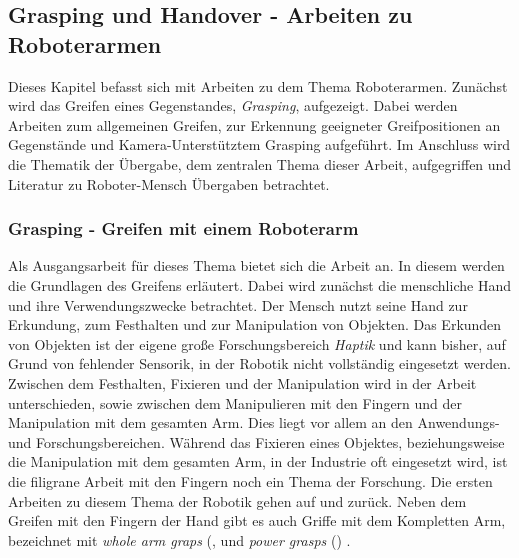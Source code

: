 \subsection{Grasping und Handover - Arbeiten zu Roboterarmen}
\label{sec:relatedwork-handover}
Dieses Kapitel befasst sich mit Arbeiten zu dem Thema Roboterarmen. Zunächst wird das Greifen eines Gegenstandes, \textit{Grasping}, aufgezeigt. Dabei werden Arbeiten zum allgemeinen Greifen, zur Erkennung geeigneter Greifpositionen an Gegenstände und Kamera-Unterstütztem Grasping aufgeführt. Im Anschluss wird die Thematik der Übergabe, dem zentralen Thema dieser Arbeit, aufgegriffen und Literatur zu Roboter-Mensch Übergaben betrachtet.

\subsubsection{Grasping - Greifen mit einem Roboterarm}
Als Ausgangsarbeit für dieses Thema bietet sich die Arbeit \cite{bicchi2000robotic} an. In diesem werden die Grundlagen des Greifens erläutert. Dabei wird zunächst die menschliche Hand und ihre Verwendungszwecke betrachtet. Der Mensch nutzt seine Hand zur Erkundung, zum Festhalten und zur Manipulation von Objekten. Das Erkunden von Objekten ist der eigene große Forschungsbereich \textit{Haptik} und kann bisher, auf Grund von fehlender Sensorik, in der Robotik nicht vollständig eingesetzt werden. Zwischen dem Festhalten, Fixieren und der Manipulation wird in der Arbeit unterschieden, sowie zwischen dem Manipulieren mit den Fingern und der Manipulation mit dem gesamten Arm. Dies liegt vor allem an den Anwendungs- und Forschungsbereichen. Während das Fixieren eines Objektes, beziehungsweise die Manipulation mit dem gesamten Arm, in der Industrie oft eingesetzt wird, ist die filigrane Arbeit mit den Fingern noch ein Thema der Forschung. Die ersten Arbeiten zu diesem Thema der Robotik gehen auf \cite{asada1979studies}  und \cite{mason1985robot} zurück. Neben dem Greifen mit den Fingern der Hand gibt es auch Griffe mit dem Kompletten Arm, bezeichnet mit \textit{whole arm graps} (\cite{townsend1988effect}, \cite{bicchi1994problem} und \textit{power grasps} (\cite{mirza1990force}) \citep{bicchi2000robotic}. 

